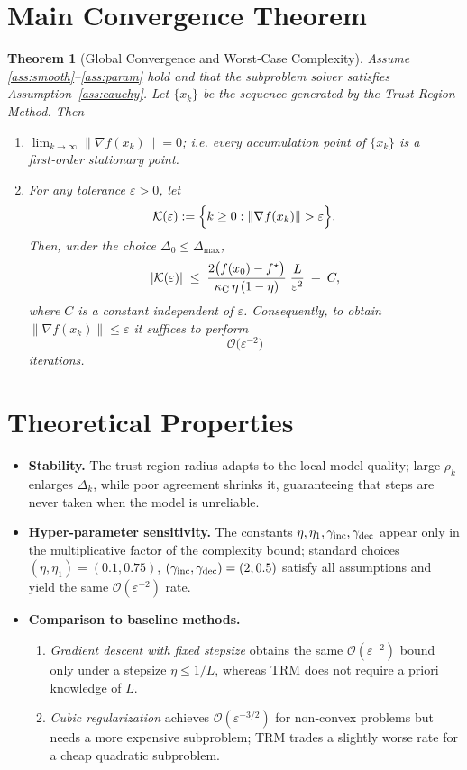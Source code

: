 \documentclass{article}
\newtheorem{theorem}{Theorem}
\begin{document}
\section*{Main Convergence Theorem}
\begin{theorem}[Global Convergence and Worst‑Case Complexity]\label{thm:main}
Assume \ref{ass:smooth}–\ref{ass:param} hold and that the subproblem solver satisfies Assumption~\ref{ass:cauchy}.  
Let $\{x_{k}\}$ be the sequence generated by the Trust Region Method. Then
\begin{enumerate}[label=(\alph*)]
\item\label{itm:limit} $\displaystyle\lim_{k\to\infty}\|\nabla f(x_{k})\|=0$; i.e. every accumulation point of $\{x_{k}\}$ is a first‑order stationary point.
\item\label{itm:complexity} For any tolerance $\varepsilon>0$, let
\[
\mathcal{K}(\varepsilon):=\Bigl\{k\ge0:\|\nabla f(x_{k})\|>\varepsilon\Bigr\}.
\]
Then, under the choice $\Delta_{0}\le\Delta_{\max}$,
\[
|\mathcal{K}(\varepsilon)|\;\le\;
\frac{2\bigl(f(x_{0})-f^{\star}\bigr)}{\kappa_{\rm C}\,\eta\,(1-\eta)}\;
\frac{L}{\varepsilon^{2}} \;+\; C,
\]
where $C$ is a constant independent of $\varepsilon$.
Consequently, to obtain $\|\nabla f(x_{k})\|\le\varepsilon$ it suffices to perform
\[
\mathcal{O}\!\bigl(\varepsilon^{-2}\bigr)
\]
iterations.
\end{enumerate}
\end{theorem}

\section*{Theoretical Properties}
\begin{itemize}
\item \textbf{Stability.} The trust‑region radius adapts to the local model quality; large $\rho_{k}$ enlarges $\Delta_{k}$, while poor agreement shrinks it, guaranteeing that steps are never taken when the model is unreliable.
\item \textbf{Hyper‑parameter sensitivity.} The constants $\eta,\eta_{1},\gamma_{\rm inc},\gamma_{\rm dec}$ appear only in the multiplicative factor of the complexity bound; standard choices $(\eta,\eta_{1})=(0.1,0.75)$, $(\gamma_{\rm inc},\gamma_{\rm dec})=(2,0.5)$ satisfy all assumptions and yield the same $\mathcal{O}(\varepsilon^{-2})$ rate.
\item \textbf{Comparison to baseline methods.}
    \begin{enumerate}[label=\roman*.]
    \item \emph{Gradient descent with fixed stepsize} obtains the same $\mathcal{O}(\varepsilon^{-2})$ bound only under a stepsize $\eta\le 1/L$, whereas TRM does not require a priori knowledge of $L$.
    \item \emph{Cubic regularization} achieves $\mathcal{O}(\varepsilon^{-3/2})$ for non‑convex problems but needs a more expensive subproblem; TRM trades a slightly worse rate for a cheap quadratic subproblem.
    \end{enumerate}
\end{itemize}
\end{document}
